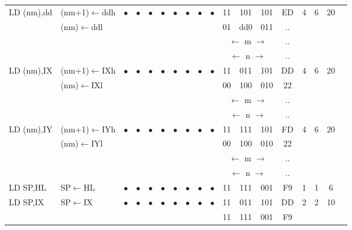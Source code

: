 \documentclass[oneside,a4paper]{book}
\begin{document}
{\begin{tabular}{llcccccccccccccccl}
		LD (nm),dd & (nm+1)$\leftarrow$ddh &
			$\bullet$ & $\bullet$ & $\bullet$ & $\bullet$ & $\bullet$ & $\bullet$ & $\bullet$ & $\bullet$ & 
			11 & 101 & 101 & 
			ED & 4 & 
			6 & 20 & \\ 
		& (nm)$\leftarrow$ddl & \multicolumn{8}{c}{} & 01 & dd0 & 011 & .. & & & \\
		\multicolumn{10}{c}{} & \multicolumn{3}{c}{$\longleftarrow$ m $\longrightarrow$} & .. & & & \\
		\multicolumn{10}{c}{} & \multicolumn{3}{c}{$\longleftarrow$ n $\longrightarrow$} & .. & & & \\[4pt]

		LD (nm),IX & (nm+1)$\leftarrow$IXh &
			$\bullet$ & $\bullet$ & $\bullet$ & $\bullet$ & $\bullet$ & $\bullet$ & $\bullet$ & $\bullet$ & 
			11 & 011 & 101 & 
			DD & 4 & 
			6 & 20 & \\ 
		& (nm)$\leftarrow$IXl & \multicolumn{8}{c}{} & 00 & 100 & 010 & 22 & & & \\
		\multicolumn{10}{c}{} & \multicolumn{3}{c}{$\longleftarrow$ m $\longrightarrow$} & .. & & & \\
		\multicolumn{10}{c}{} & \multicolumn{3}{c}{$\longleftarrow$ n $\longrightarrow$} & .. & & & \\[4pt]

		LD (nm),IY & (nm+1)$\leftarrow$IYh &
			$\bullet$ & $\bullet$ & $\bullet$ & $\bullet$ & $\bullet$ & $\bullet$ & $\bullet$ & $\bullet$ & 
			11 & 111 & 101 & 
			FD & 4 & 
			6 & 20 & \\ 
		& (nm)$\leftarrow$IYl & \multicolumn{8}{c}{} & 00 & 100 & 010 & 22 & & & \\
		\multicolumn{10}{c}{} & \multicolumn{3}{c}{$\longleftarrow$ m $\longrightarrow$} & .. & & & \\
		\multicolumn{10}{c}{} & \multicolumn{3}{c}{$\longleftarrow$ n $\longrightarrow$} & .. & & & \\[4pt]

		LD SP,HL & SP$\leftarrow$HL & 
			$\bullet$ & $\bullet$ & $\bullet$ & $\bullet$ & $\bullet$ & $\bullet$ & $\bullet$ & $\bullet$ & 
			11 & 111 & 001 & 
			F9 & 1 & 
			1 & 6 & \\[4pt]

		LD SP,IX & SP$\leftarrow$IX & 
			$\bullet$ & $\bullet$ & $\bullet$ & $\bullet$ & $\bullet$ & $\bullet$ & $\bullet$ & $\bullet$ & 
			11 & 011 & 101 & 
			DD & 2 & 
			2 & 10 & \\ 
		\multicolumn{10}{c}{} & 11 & 111 & 001 & F9 & & & \\[4pt]


\end{tabular}}
\end{document}
